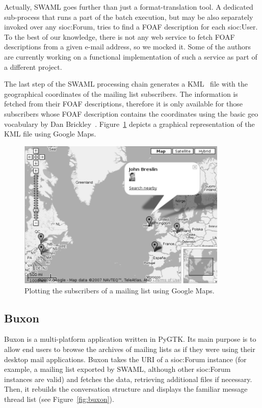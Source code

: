 \documentclass{llncs}
\begin{document}
Actually, SWAML goes further than just a format-translation
tool. A dedicated sub-process that runs a part of the batch
execution, but may be also separately invoked over any
\textsf{sioc:Forum}, tries to find a FOAF description for
each \textsf{sioc:User}. To the best of our knowledge, there is not
any web service to fetch FOAF descriptions from a given e-mail
address, so we mocked it. Some of the authors are currently working
on a functional implementation of such a service as part of a
different project.

The last step of the SWAML processing chain generates a
KML~\cite{Ricket2006} file with the geographical coordinates of
the mailing list subscribers. The information is fetched from their
FOAF descriptions, therefore it is only available for those
subscribers whose FOAF description contains the coordinates
using the basic \textsf{geo} vocabulary by Dan
Brickley~\cite{Brickley2006}.
Figure~\ref{fig:googlemaps} depicts a graphical representation
of the KML file using Google Maps.

\begin{figure}[ht]
 \centering
 \includegraphics[bb=0 0 400 285,width=10cm]{images/googlemaps.png}
 \caption{\label{fig:googlemaps}Plotting the subscribers of a mailing list using Google Maps.}
\end{figure}

\subsection{Buxon}

Buxon is a multi-platform application written in PyGTK. Its main purpose
is to allow end users to browse the archives of mailing lists as if
they were using their desktop mail applications. Buxon takes
the URI of a \textsf{sioc:Forum} instance (for example, a mailing list
exported by SWAML, although other \textsf{sioc:Forum} instances
are valid) and fetches the data, retrieving additional files
if necessary. Then, it rebuilds the conversation structure and
displays the familiar message thread list (see Figure~\ref{fig:buxon}).
\end{document}
